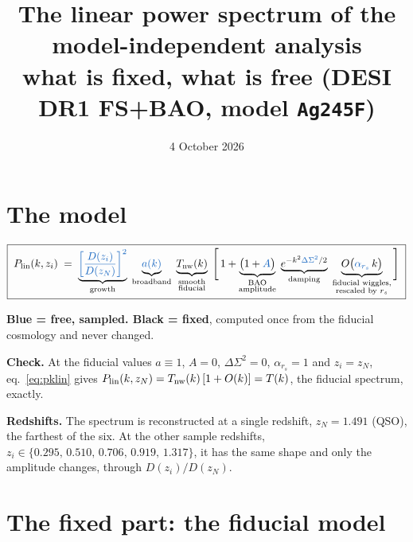 \documentclass[11pt]{article}
\title{The linear power spectrum of the model-independent analysis\\[2pt]
\large what is fixed, what is free (DESI DR1 FS+BAO, model \texttt{Ag245F})}
\date{4 October 2026}
\newcommand{\free}[1]{{\color{freeblue}#1}}
\begin{document}
\maketitle

\section{The model}

\begin{equation}
\boxed{\;
P_{\rm lin}(k,z_i)\;=\;
\underbrace{\free{\left[\frac{D(z_i)}{D(z_N)}\right]^{2}}}_{\text{growth}}\;
\underbrace{\free{a(k)}}_{\text{broadband}}\;
\underbrace{T_{\rm nw}(k)}_{\substack{\text{smooth}\\ \text{fiducial}}}\;
\Bigg[\,1+\underbrace{\big(1+\free{A}\big)}_{\substack{\text{BAO}\\ \text{amplitude}}}\;
\underbrace{e^{-k^2\free{\Delta\Sigma^2}/2}}_{\text{damping}}\;
\underbrace{O\big(\free{\alpha_{r_s}}\,k\big)}_{\substack{\text{fiducial wiggles,}\\ \text{rescaled by } r_s}}\Bigg]
\;}
\label{eq:pklin}
\end{equation}

\textbf{\free{Blue} = free, sampled. Black = fixed}, computed once from the fiducial cosmology and never changed.

\textbf{Check.} At the fiducial values $a\equiv1$, $A=0$, $\Delta\Sigma^2=0$, $\alpha_{r_s}=1$ and $z_i=z_N$,
eq.~\eqref{eq:pklin} gives $P_{\rm lin}(k,z_N)=T_{\rm nw}(k)\,[1+O(k)]=T(k)$, the fiducial spectrum, exactly.

\textbf{Redshifts.} The spectrum is reconstructed at a single redshift, $z_N=1.491$ (QSO), the farthest of the six.
At the other sample redshifts, $z_i\in\{0.295,\,0.510,\,0.706,\,0.919,\,1.317\}$, it has the same shape and only the
amplitude changes, through $D(z_i)/D(z_N)$.

\section{The fixed part: the fiducial model}
\end{document}
